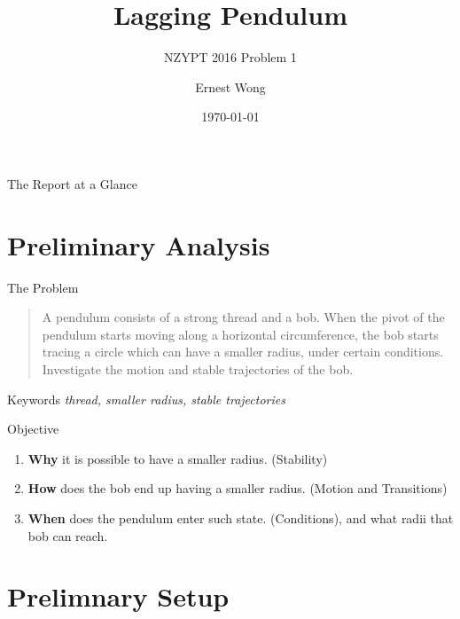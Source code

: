 \documentclass[10pt, compress]{beamer}
\title{Lagging Pendulum}
\subtitle{NZYPT 2016 Problem 1}
\date{\today}
\author{Ernest Wong}
\institute{Macleans College}
\begin{document}
\maketitle




\begin{frame}{The Report at a Glance}
    \begin{center}
    \tableofcontents
    \end{center}
\end{frame}




\section{Preliminary Analysis}



\begin{frame}{The Problem}
    \begin{quote}
        A pendulum consists of a strong thread and a bob. When the pivot of the pendulum starts moving along a horizontal circumference, the bob starts tracing a circle which can have a smaller radius, under certain conditions. Investigate the motion and stable trajectories of the bob.
    \end{quote}
    \pause
    \begin{block}{Keywords}
        \emph{thread, smaller radius, stable trajectories}
    \end{block}
\end{frame}

\begin{frame}{Objective}
    \begin{enumerate}
        \item \textbf{Why} it is possible to have a smaller radius. \alert{(Stability)}
        \item \textbf{How} does the bob end up having a smaller radius. \alert{(Motion and Transitions)}
        \item \textbf{When} does the pendulum enter such state. \alert{(Conditions)}, and what radii that bob can reach.
    \end{enumerate}
\end{frame}

\section{Prelimnary Setup}
\end{document}
